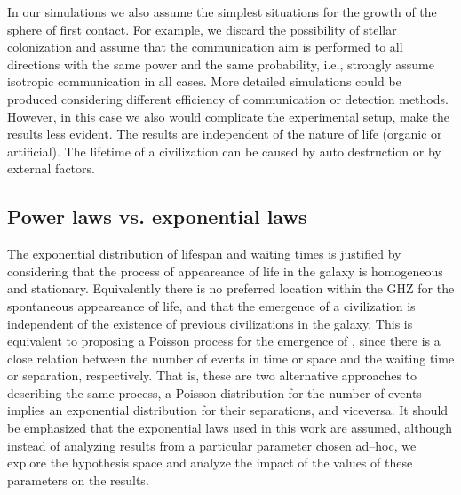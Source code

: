 In our simulations we also assume the simplest situations for the
growth of the sphere of first contact.
%
For example, we discard the possibility of stellar colonization
\citep[e.g.][]{newman_galactic_1981, walters_interstellar_1980,
starling_virulence_2013, barlow_galactic_2012, jeong_large_2000,
maccone_mathematical_2011} and assume that the communication aim is
performed to all directions with the same power and the same
probability, i.e., strongly assume isotropic communication in all
cases.
%
More detailed simulations could be produced considering different
efficiency of communication or detection methods.
%
%
%
However, in this case we also would complicate the experimental setup,
make the results less evident.
%
The results are independent of the nature of life (organic or
artificial).
%
The lifetime of a civilization can be caused by auto destruction or by
external factors.


\subsection{Power laws vs. exponential laws}\label{SS_PDF_shape}

The exponential distribution of lifespan and waiting times is
justified by considering that the process of appeareance of life in
the galaxy is homogeneous and stationary.
%
Equivalently there is no preferred location within the GHZ for the
spontaneous appeareance of life, and that the emergence of a
civilization is independent of the existence of previous civilizations
in the galaxy.
%            
This is equivalent to proposing a Poisson process for the emergence of
\cetis, since there is a close relation between the number of events in
time or space and the waiting time or separation, respectively.
%
That is, these are two alternative approaches to describing the same
process, a Poisson distribution for the number of events implies an
exponential distribution for their separations, and viceversa.
%
It should be emphasized that the exponential laws used in this work
are assumed, although instead of analyzing results from a particular
parameter chosen ad--hoc, we explore the hypothesis space and analyze
the impact of the values of these parameters on the results.
                                                           

